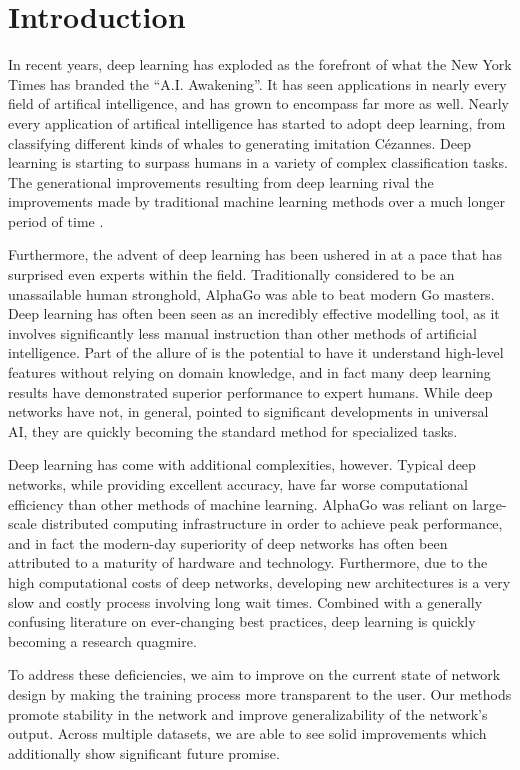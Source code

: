 \chapter{Introduction}

In recent years, deep learning has exploded as the forefront of what the New York Times has branded the ``A.I. Awakening''.
It has seen applications in nearly every field of artifical intelligence, and has grown to encompass far more as well.
Nearly every application of artifical intelligence has started to adopt deep learning, from classifying different kinds of whales to generating imitation C\'{e}zannes.
Deep learning is starting to surpass humans in a variety of complex classification tasks.
The generational improvements resulting from deep learning  rival the improvements made by traditional machine learning methods over a much longer period of time \cite{aiawakening}.

Furthermore, the advent of deep learning has been ushered in at a pace that has surprised even experts within the field.
Traditionally considered to be an unassailable human stronghold, AlphaGo \cite{silver2016mastering} was able to beat modern Go masters.
Deep learning has often been seen as an incredibly effective modelling tool, as it involves significantly less manual instruction than other methods of artificial intelligence.
Part of the allure of is the potential to have it understand high-level features without relying on domain knowledge, and in fact many deep learning results have demonstrated superior performance to expert humans.
While deep networks have not, in general, pointed to significant developments in universal AI, they are quickly becoming the standard method for specialized tasks.


Deep learning has come with additional complexities, however.
Typical deep networks, while providing excellent accuracy, have far worse computational efficiency than other methods of machine learning.
AlphaGo was reliant on large-scale distributed computing infrastructure in order to achieve peak performance, and in fact the modern-day superiority of deep networks has often been attributed to a maturity of hardware and technology.
Furthermore, due to the high computational costs of deep networks, developing new architectures is a very slow and costly process involving long wait times.
Combined with a generally confusing literature on ever-changing best practices, deep learning is quickly becoming a research quagmire.

To address these deficiencies, we aim to improve on the current state of network design by making the training process more transparent to the user.
Our methods promote stability in the network and improve generalizability of the network's output.
Across multiple datasets, we are able to see solid improvements which additionally show significant future promise.